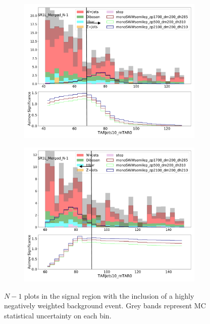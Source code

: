   \begin{figure}[htbp]
    \centering
     \begin{subfigure}{0.49\textwidth}
     \includegraphics[width = 0.98\textwidth]{Figures/4/N1n/TARJets10_mTAR0.pdf}
     \caption{\mTAR}
     \end{subfigure}
     \begin{subfigure}{0.49\textwidth}
     \includegraphics[width = 0.98\textwidth]{Figures/4/N1n/TARJets10_mTAR02.pdf}
     \caption{\mTAR}
     \end{subfigure}

     \caption{$N-1$ plots in the \merged signal region with the inclusion of a highly negatively weighted background event. Grey bands represent MC statistical uncertainty on each bin.}
     \label{fig:SRN1_backup}
  \end{figure}
\FloatBarrier
